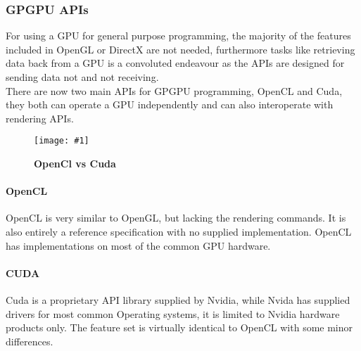 \documentclass[12pt,a4paper]{article}
\newcommand{\figuremacroWHHN}[3]{
	\begin{figure}[H] %
		\centering
		\texttt{[image: \#1]}
		\caption[#2]{\textbf{#2}}
		\label{fig:#1}
	\end{figure}
}
\begin{document}
\subsubsection{GPGPU APIs}
For using  a GPU for general purpose programming, the majority of the features included in OpenGL or DirectX are not needed, furthermore tasks like retrieving data back from a GPU is a convoluted endeavour as the APIs are designed for sending data not and not receiving.
\\
There are now two main APIs for GPGPU programming, OpenCL and Cuda, they both can operate a GPU independently and can also interoperate with rendering APIs.

\figuremacroWHHN
{clvscudaov}
{OpenCl vs Cuda \cite{6419068}}
{0.8}

\paragraph{OpenCL}
OpenCL is very similar to OpenGL, but lacking the rendering commands. It is also entirely a reference specification with no supplied implementation. OpenCL has implementations on most of the common GPU hardware.

\paragraph{CUDA}
Cuda is a proprietary API library supplied by Nvidia, while Nvida has supplied drivers for most common Operating systems,  it is limited to Nvidia hardware products only. The feature set is virtually identical to OpenCL with some minor differences.
\end{document}
